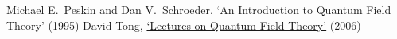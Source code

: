 \documentclass{report}
\begin{document}
\maketitle
\hypersetup{linkcolor=black}
\renewcommand{\baselinestretch}{1}
\tableofcontents
\renewcommand{\baselinestretch}{1.3}
\hypersetup{linkcolor=MidnightBlue!50!BlueViolet}
\newpage

























\begin{thebibliography}{99}

 Michael E.~Peskin and Dan V.~Schroeder, `An Introduction to Quantum Field Theory' (1995)
 David Tong, \href{http://www.damtp.cam.ac.uk/user/tong/qft.html}{`Lectures on Quantum Field Theory'} (2006)

\end{thebibliography}
\end{document}
